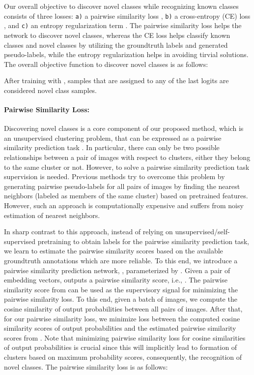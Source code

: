 \documentclass[runningheads]{eccv2022submission}
\newcommand{\txt}[1]{{\texttt{#1}}}
\begin{document}
Our overall objective to discover novel classes while recognizing known classes consists of three losses: \txt{a)} a pairwise similarity loss ,  \txt{b)} a cross-entropy (CE) loss , and  \txt{c)} an entropy regularization term . The pairwise similarity loss helps the network to discover novel classes, whereas the CE loss helps classify known classes and novel classes by utilizing the groundtruth labels and generated pseudo-labels, while the entropy regularization helps in avoiding tirvial solutions. The overall objective function to discover novel classes is as follows:
\setlength{\abovedisplayskip}{0pt}
\setlength{\belowdisplayskip}{2pt}
\setlength{\abovedisplayshortskip}{0pt}
\setlength{\belowdisplayshortskip}{0pt}


After training with , samples that are assigned to any of the last  logits are considered novel class samples.

\vspace{-2mm}
\paragraph{\textbf{Pairwise Similarity Loss:}}
\label{par:pair}
Discovering novel classes is a core component of our proposed method, which is an unsupervised clustering problem, that can be expressed as a pairwise similarity prediction task \cite{chang2017deep,wu2019deep}. In particular, there can only be two possible relationships between a pair of images with respect to clusters, either they belong to the same cluster or not. However, to solve a pairwise similarity prediction task supervision is needed. Previous methods \cite{cao2022openworld,Han2020Automatically} try to overcome this problem by generating pairwise pseudo-labels for all pairs of images by finding the nearest neighbors (labeled as members of the same cluster) based on pretrained features. However, such an approach is computationally expensive and suffers from noisy estimation of nearest neighbors.     


In sharp contrast to this approach, instead of relying on unsupervised/self-supervised pretraining to obtain labels for the pairwise similarity prediction task, we learn to estimate the pairwise similarity scores based on the available groundtruth annotations which are more reliable. To this end, we introduce a pairwise similarity prediction network, , parameterized by . Given a pair of embedding vectors,  outputs a pairwise similarity score, i.e., . The pairwise similarity score from  can be used as the supervisory signal for minimizing the pairwise similarity loss. To this end, given a batch of images, we compute the cosine similarity of output probabilities between all pairs of images. After that, for our pairwise similarity loss, we minimize  loss between the computed cosine similarity scores of output probabilities and the estimated pairwise similarity scores from . Note that minimizing pairwise similarity loss for cosine similarities of output probabilities is crucial since this will implicitly lead to formation of clusters based on maximum probability scores, consequently, the recognition of novel classes. The pairwise similarity loss is as follows:
\end{document}
